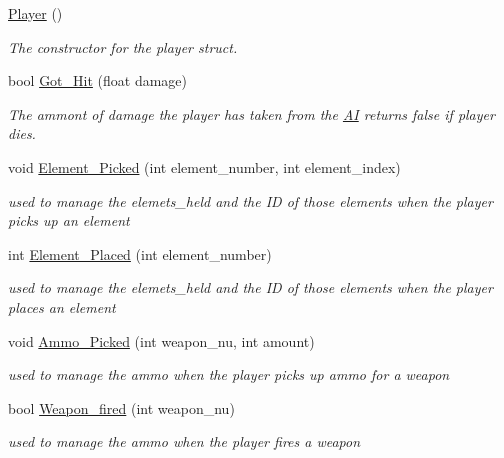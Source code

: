 \begin{DoxyCompactItemize}
\item 
\hyperlink{structoctet_1_1_player_a8de855145bcf188d660ff1d9d4246753}{Player} ()
\begin{DoxyCompactList}\small\item\em The constructor for the player struct. \end{DoxyCompactList}\item 
bool \hyperlink{structoctet_1_1_player_a13aa8303245371b0fe4a27dedfb4c407}{Got\+\_\+\+Hit} (float damage)
\begin{DoxyCompactList}\small\item\em The ammont of damage the player has taken from the \hyperlink{structoctet_1_1_a_i}{A\+I} returns false if player dies. \end{DoxyCompactList}\item 
void \hyperlink{structoctet_1_1_player_a81bdc1d052b577d6f903863e1b75d985}{Element\+\_\+\+Picked} (int element\+\_\+number, int element\+\_\+index)
\begin{DoxyCompactList}\small\item\em used to manage the elemets\+\_\+held and the I\+D of those elements when the player picks up an element \end{DoxyCompactList}\item 
int \hyperlink{structoctet_1_1_player_ae4042f98a122ecf6cb43b43ef11452d7}{Element\+\_\+\+Placed} (int element\+\_\+number)
\begin{DoxyCompactList}\small\item\em used to manage the elemets\+\_\+held and the I\+D of those elements when the player places an element \end{DoxyCompactList}\item 
void \hyperlink{structoctet_1_1_player_ab1d777f5bee592f8cb1a733538fe1e5e}{Ammo\+\_\+\+Picked} (int weapon\+\_\+nu, int amount)
\begin{DoxyCompactList}\small\item\em used to manage the ammo when the player picks up ammo for a weapon \end{DoxyCompactList}\item 
bool \hyperlink{structoctet_1_1_player_a3c5f8a869d270b1a91830f2543f43901}{Weapon\+\_\+fired} (int weapon\+\_\+nu)
\begin{DoxyCompactList}\small\item\em used to manage the ammo when the player fires a weapon \end{DoxyCompactList}\end{DoxyCompactItemize}

